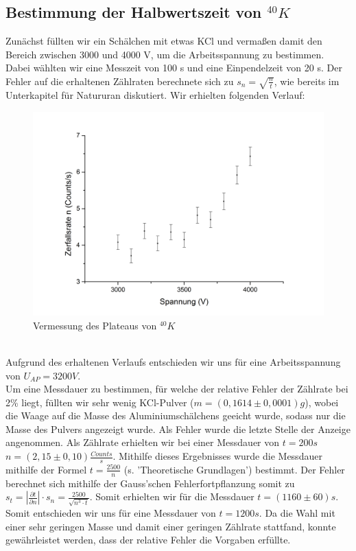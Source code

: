 \subsection{Bestimmung der Halbwertszeit von $^{40}K$}
Zunächst füllten wir ein Schälchen mit etwas KCl und vermaßen damit den Bereich zwischen 3000 und 4000 V, um die Arbeitsspannung zu bestimmen. Dabei wählten wir eine Messzeit von 100 s und eine Einpendelzeit von 20 s. Der Fehler auf die erhaltenen Zählraten berechnete sich zu $s_{n}=\sqrt{\frac{n}{t}}$, wie bereits im Unterkapitel für Natururan diskutiert.  Wir erhielten folgenden Verlauf:
\begin{figure}[h]
\begin{center}
\includegraphics[scale=0.4]{Bilder/apkalium}
\caption{Vermessung des Plateaus von $^{40}K$}
\end{center}
\end{figure}
~\\
Aufgrund des erhaltenen Verlaufs entschieden wir uns für eine Arbeitsspannung von $U_{AP}=3200V$.\\
Um eine Messdauer zu bestimmen, für welche der relative Fehler der Zählrate bei 2\% liegt, füllten wir sehr wenig KCl-Pulver ($m=(0,1614\pm0,0001)g$), wobei die Waage auf die Masse des Aluminiumschälchens geeicht wurde, sodass nur die Masse des Pulvers angezeigt wurde. Als Fehler wurde die letzte Stelle der Anzeige angenommen. Als Zählrate erhielten wir bei einer Messdauer von $t=200s$ $n=(2,15\pm0,10)\frac{Counts}{s}$. Mithilfe dieses Ergebnisses wurde die Messdauer mithilfe der Formel $t=\frac{2500}{n}$ (s. 'Theoretische Grundlagen') bestimmt. Der Fehler berechnet sich mithilfe der Gauss'schen Fehlerfortpflanzung somit zu $s_{t}=\left|\frac{\partial t}{\partial n}\right|\cdot s_{n}=\frac{2500}{\sqrt{n^{3}\cdot t}}$. Somit erhielten wir für die Messdauer $t=(1160\pm60)s$. Somit entschieden wir uns für eine Messdauer von $t=1200s$. Da die Wahl mit einer sehr geringen Masse und damit einer geringen Zählrate stattfand, konnte gewährleistet werden, dass der relative Fehler die Vorgaben erfüllte. \\
